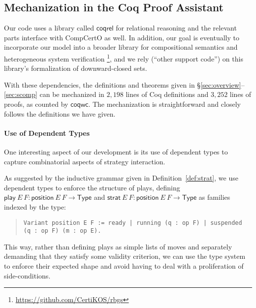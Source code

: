\documentclass[acmsmall,screen,review,nonacm]{acmart}
\newcommand{\kw}[1]{\ensuremath{ \mathsf{#1} }}
\begin{document}
\subsection{Mechanization in the Coq Proof Assistant} \label{sec:application:impl} %

Our code uses a library called $\kw{coqrel}$ \cite{coqrel}
for relational reasoning
and the relevant parts interface with CompCertO as well.
In addition,
our goal is eventually to incorporate our model
into a broader library for compositional semantics
and heterogeneous system verification%
\footnote{\url{https://github.com/CertiKOS/rbgs}}\!,
and we rely (``other support code'') on this library's formalization of
downward-closed sets.

With these dependencies,
the definitions and theorems 
given in \S\ref{sec:overview}--\ref{sec:scomp}
can be mechanized in $2,198$ lines of Coq definitions and
$3,252$ lines of proofs, as counted by $\kw{coqwc}$.
The mechanization
is straightforward and closely follows the definitions we have given.

\paragraph{Use of Dependent Types} %

One interesting aspect of our development is its use of dependent types
to capture combinatorial aspects of strategy interaction.

As suggested by the inductive grammar given in Definition~\ref{def:strat},
we use dependent types to enforce the structure of plays, defining
$\kw{play}\ E\ F : \kw{position}\ E\ F \rightarrow \kw{Type}$ and
$\kw{strat}\ E\ F : \kw{position}\ E\ F \rightarrow \kw{Type}$
as families indexed by the type:
\begin{quote}\footnotesize
\verb!Variant position E F := ready | running (q : op F) | suspended (q : op F) (m : op E).!
\end{quote}
This way,
rather than defining plays as simple lists of moves and
separately demanding that they satisfy some validity criterion,
we can use the type system to enforce their expected shape
and avoid having to deal with a proliferation of side-conditions.
\end{document}
